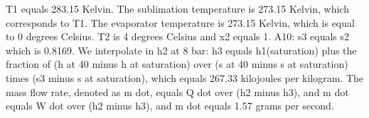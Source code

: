 T1 equals 283.15 Kelvin.
The sublimation temperature is 273.15 Kelvin, which corresponds to T1.
The evaporator temperature is 273.15 Kelvin, which is equal to 0 degrees Celsius.
T2 is 4 degrees Celsius and x2 equals 1.
A10: s3 equals s2 which is 0.8169.
We interpolate in h2 at 8 bar:
h3 equals h1(saturation) plus the fraction of (h at 40 minus h at saturation) over (s at 40 minus s at saturation) times (s3 minus s at saturation), which equals 267.33 kilojoules per kilogram.
The mass flow rate, denoted as m dot, equals Q dot over (h2 minus h3), and m dot equals W dot over (h2 minus h3), and m dot equals 1.57 grams per second.